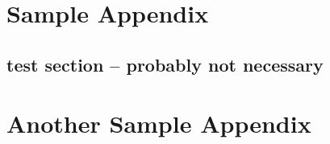 \documentclass{ritthesis}
\begin{document}
\nocite{cheung,zhao,cao,zhang}

\nocite{*}

\cleardoublepage
{}
{}



\appendix

\chapter{Sample Appendix}

\section{test section -- probably not necessary}
\lipsum[6-9]
\chapter{Another Sample Appendix}
\lipsum[10-11]

\end{document}
